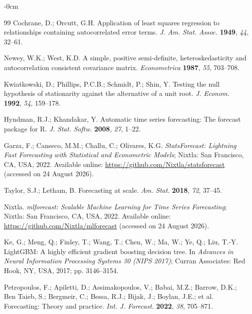 \documentclass[forecasting,article,submit,pdftex,moreauthors]{Definitions/mdpi}
\begin{document}
\begin{adjustwidth}{-\extralength}{0cm}
\begin{thebibliography}{99}
Cochrane, D.; Orcutt, G.H. Application of least squares regression to relationships containing autocorrelated error terms. \textit{J. Am. Stat. Assoc.} \textbf{1949}, \textit{44}, 32--61.

Newey, W.K.; West, K.D. A simple, positive semi-definite, heteroskedasticity and autocorrelation consistent covariance matrix. \textit{Econometrica} \textbf{1987}, \textit{55}, 703--708.

Kwiatkowski, D.; Phillips, P.C.B.; Schmidt, P.; Shin, Y. Testing the null hypothesis of stationarity against the alternative of a unit root. \textit{J. Econom.} \textbf{1992}, \textit{54}, 159--178.

Hyndman, R.J.; Khandakar, Y. Automatic time series forecasting: The forecast package for R. \textit{J. Stat. Softw.} \textbf{2008}, \textit{27}, 1--22.

Garza, F.; Canseco, M.M.; Challu, C.; Olivares, K.G. \textit{StatsForecast: Lightning Fast Forecasting with Statistical and Econometric Models}; Nixtla: San Francisco, CA, USA, 2022. Available online: \url{https://github.com/Nixtla/statsforecast} (accessed on 24 August 2026).

Taylor, S.J.; Letham, B. Forecasting at scale. \textit{Am. Stat.} \textbf{2018}, \textit{72}, 37--45.

Nixtla. \textit{mlforecast: Scalable Machine Learning for Time Series Forecasting}; Nixtla: San Francisco, CA, USA, 2022. Available online: \url{https://github.com/Nixtla/mlforecast} (accessed on 24 August 2026).

Ke, G.; Meng, Q.; Finley, T.; Wang, T.; Chen, W.; Ma, W.; Ye, Q.; Liu, T.-Y. LightGBM: A highly efficient gradient boosting decision tree. In \textit{Advances in Neural Information Processing Systems 30 (NIPS 2017)}; Curran Associates: Red Hook, NY, USA, 2017; pp. 3146--3154.

Petropoulos, F.; Apiletti, D.; Assimakopoulos, V.; Babai, M.Z.; Barrow, D.K.; Ben Taieb, S.; Bergmeir, C.; Bessa, R.J.; Bijak, J.; Boylan, J.E.; et al. Forecasting: Theory and practice. \textit{Int. J. Forecast.} \textbf{2022}, \textit{38}, 705--871.

\end{thebibliography}

%


\end{adjustwidth}
\end{document}
